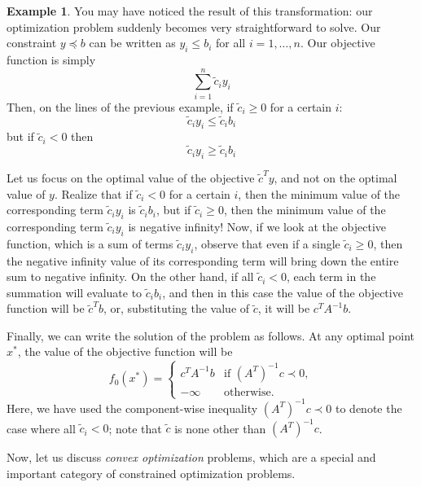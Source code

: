 \documentclass[a4paper]{article}
\theoremstyle{definition}
\newtheorem{example}{Example}[subsection]
\begin{document}
\begin{example}
	You may have noticed the result of this transformation: our optimization problem suddenly becomes very straightforward to solve.
	Our constraint $y \preceq b$ can be written as $y_i \leq b_i$ for all $i = 1, \dots, n$.
	Our objective function is simply
	\begin{equation*}
		\sum_{i=1}^n \tilde{c}_i y_i
	\end{equation*}
	Then, on the lines of the previous example, if $\tilde{c}_i \geq 0$ for a certain $i$:
	\begin{equation*}
		\tilde{c}_i y_i \leq \tilde{c}_i b_i
	\end{equation*}
	but if $\tilde{c}_i < 0$ then
	\begin{equation*}
		\tilde{c}_i y_i \geq \tilde{c}_i b_i
	\end{equation*}

	Let us focus on the optimal value of the objective $\tilde{c}^T y$, and not on the optimal value of $y$.
	Realize that if $\tilde{c}_i < 0$ for a certain $i$, then the minimum value of the corresponding term $\tilde{c}_i y_i$ is $\tilde{c}_i b_i$, but if $\tilde{c}_i \geq 0$, then the minimum value of the corresponding term $\tilde{c}_i y_i$ is negative infinity!
	Now, if we look at the objective function, which is a sum of terms $\tilde{c}_i y_i$, observe that even if a single $\tilde{c}_i \geq 0$, then the negative infinity value of its corresponding term will bring down the entire sum to negative infinity.
	On the other hand, if all $\tilde{c}_i < 0$, each term in the summation will evaluate to $\tilde{c}_i b_i$, and then in this case the value of the objective function will be $\tilde{c}^T b$, or, substituting the value of $\tilde{c}$, it will be $c^T A^{-1} b$.

	Finally, we can write the solution of the problem as follows.
	At any optimal point $x^*$, the value of the objective function will be
	\begin{equation*}
		f_0(x^*) = \begin{cases}
			c^T A^{-1} b & \text{if } (A^T)^{-1} c \prec 0, \\
			-\infty & \text{otherwise.}
		\end{cases}
	\end{equation*}
	Here, we have used the component-wise inequality $(A^T)^{-1} c \prec 0$ to denote the case where all $\tilde{c}_i < 0$; note that $\tilde{c}$ is none other than $(A^T)^{-1} c$.
\end{example}

Now, let us discuss \textit{convex optimization} problems, which are a special and important category of constrained optimization problems.
\end{document}
